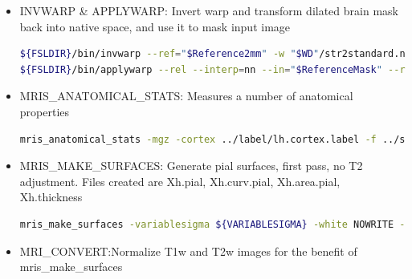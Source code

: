 \documentclass{article}
\begin{document}
\begin{itemize}
\begin{lstlisting}[language=bash, basicstyle=\tiny]
%~ Register to 2mm reference image (linear then non-linear)
%~ ${FSLDIR}/bin/flirt -interp spline -dof 12 -in "$Input" -ref "$Reference2mm" 
                    %~ -omat "$WD"/roughlin.mat -out "$WD"/"$BaseName"_to_MNI_roughlin.nii.gz -nosearch

%~ ${FSLDIR}/bin/fnirt --in="$Input" --ref="$Reference2mm" --aff="$WD"/roughlin.mat
                    %~ --refmask="$Reference2mmMask" --fout="$WD"/str2standard.nii.gz
                    %~ --jout="$WD"/NonlinearRegJacobians.nii.gz --refout="$WD"/IntensityModulatedT1.nii.gz
                    %~ --iout="$WD"/"$BaseName"_to_MNI_nonlin.nii.gz
                    %~ --logout="$WD"/NonlinearReg.txt --intout="$WD"/NonlinearIntensities.nii.gz
                    %~ --cout="$WD"/NonlinearReg.nii.gz --config="$FNIRTConfig"
    \end{lstlisting}

\item INVWARP \& APPLYWARP: Invert warp and transform dilated brain mask back into native space, and use it to mask input image
    \begin{lstlisting}[language=bash, basicstyle=\tiny]
${FSLDIR}/bin/invwarp --ref="$Reference2mm" -w "$WD"/str2standard.nii.gz -o "$WD"/standard2str.nii.gz
${FSLDIR}/bin/applywarp --rel --interp=nn --in="$ReferenceMask" --ref="$Input" -w "$WD"/standard2str.nii.gz -o "$OutputBrainMask"
    \end{lstlisting}

\item MRIS\_ANATOMICAL\_STATS: Measures a number of anatomical properties
    \begin{lstlisting}[language=bash, basicstyle=\tiny]
mris_anatomical_stats -mgz -cortex ../label/lh.cortex.label -f ../stats/lh.aparc.a2009s.stats -b -a ../label/lh.aparc.a2009s.annot -c ../label/aparc.annot.a2009s.ctab 0050299 lh white
    \end{lstlisting}

\item MRIS\_MAKE\_SURFACES: Generate pial surfaces, first pass, no T2 adjustment. Files created are Xh.pial, Xh.curv.pial, Xh.area.pial, Xh.thickness
    \begin{lstlisting}[language=bash, basicstyle=\tiny]
mris_make_surfaces -variablesigma ${VARIABLESIGMA} -white NOWRITE -aseg aseg.hires -orig white.deformed -filled filled.hires -wm wm.hires -sdir $SubjectDIR -mgz -T1 T1w_hires.norm "$SubjectID" lh
    \end{lstlisting}

\item MRI\_CONVERT:Normalize T1w and T2w images for the benefit of mris\_make\_surfaces


\end{itemize}
\end{document}
